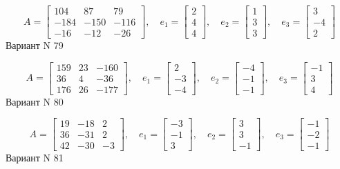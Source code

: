 \documentclass[11pt]{report}
\begin{document}
$$A = \left[\begin{matrix}104 & 87 & 79\\-184 & -150 & -116\\-16 & -12 & -26\end{matrix}\right],\quad e_1 = \left[\begin{matrix}2\\4\\4\end{matrix}\right],\quad e_2 = \left[\begin{matrix}1\\3\\3\end{matrix}\right],\quad e_3 = \left[\begin{matrix}3\\-4\\2\end{matrix}\right]$$Вариант N 79

$$A = \left[\begin{matrix}159 & 23 & -160\\36 & 4 & -36\\176 & 26 & -177\end{matrix}\right],\quad e_1 = \left[\begin{matrix}2\\-3\\-4\end{matrix}\right],\quad e_2 = \left[\begin{matrix}-4\\-1\\-1\end{matrix}\right],\quad e_3 = \left[\begin{matrix}-1\\3\\4\end{matrix}\right]$$Вариант N 80

$$A = \left[\begin{matrix}19 & -18 & 2\\36 & -31 & 2\\42 & -30 & -3\end{matrix}\right],\quad e_1 = \left[\begin{matrix}-3\\-1\\3\end{matrix}\right],\quad e_2 = \left[\begin{matrix}3\\3\\-1\end{matrix}\right],\quad e_3 = \left[\begin{matrix}-1\\-2\\-1\end{matrix}\right]$$Вариант N 81
\end{document}
